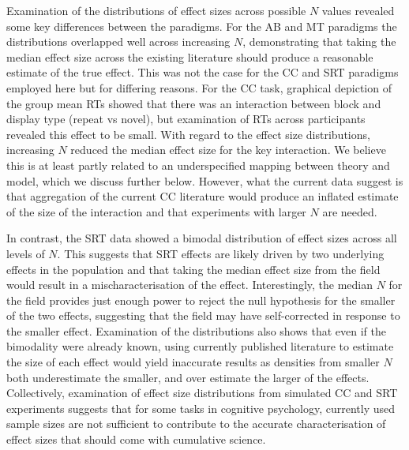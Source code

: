 \documentclass{article}
\begin{document}
Examination of the distributions of effect sizes across possible \(N\) values revealed some key differences between the paradigms. For the AB and MT paradigms the distributions overlapped well across increasing \(N\), demonstrating that taking the median effect size across the existing literature should produce a reasonable estimate of the true effect. This was not the case for the CC and SRT paradigms employed here but for differing reasons. For the CC task, graphical depiction of the group mean RTs showed that there was an interaction between block and display type (repeat vs novel), but examination of RTs across participants revealed this effect to be small. With regard to the effect size distributions, increasing \(N\) reduced the median effect size for the key interaction. We believe this is at least partly related to an underspecified mapping between theory and model, which we discuss further below. However, what the current data suggest is that aggregation of the current CC literature would produce an inflated estimate of the size of the interaction and that experiments with larger \(N\) are needed.

In contrast, the SRT data showed a bimodal distribution of effect sizes across all levels of \(N\). This suggests that SRT effects are likely driven by two underlying effects in the population and that taking the median effect size from the field would result in a mischaracterisation of the effect. Interestingly, the median \(N\) for the field provides just enough power to reject the null hypothesis for the smaller of the two effects, suggesting that the field may have self-corrected in response to the smaller effect. Examination of the distributions also shows that even if the bimodality were already known, using currently published literature to estimate the size of each effect would yield inaccurate results as densities from smaller \(N\) both underestimate the smaller, and over estimate the larger of the effects. Collectively, examination of effect size distributions from simulated CC and SRT experiments suggests that for some tasks in cognitive psychology, currently used sample sizes are not sufficient to contribute to the accurate characterisation of effect sizes that should come with cumulative science.
\end{document}
